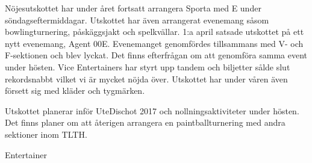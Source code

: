 \documentclass[../_main/handlingar.tex]{subfiles}
\begin{document}
Nöjesutskottet har under året fortsatt arrangera Sporta med E under söndagseftermiddagar. Utskottet har även arrangerat evenemang såsom bowlingturnering, påskäggsjakt och spelkvällar. 1:a april satsade utskottet på ett nytt evenemang, Agent 00E. Evenemanget genomfördes tillsammans med V- och F-sektionen och blev lyckat. Det finns efterfrågan om att genomföra samma event under hösten. Vice Entertainers har styrt upp tandem och biljetter sålde slut rekordsnabbt vilket vi är mycket nöjda över. Utskottet har under våren även försett sig med kläder och tygmärken.

Utskottet planerar inför UteDischot 2017 och nollningsaktiviteter under hösten. Det finns planer om att återigen arrangera en paintballturnering med andra sektioner inom TLTH.
\begin{signatures}{1}
    \mvh
    \signature{Adam Belfrage}{Entertainer}
\end{signatures}
\end{document}
